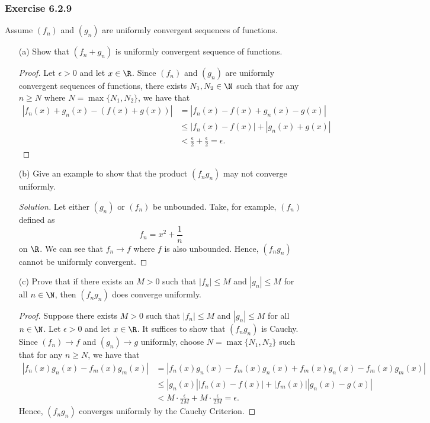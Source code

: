 \subsubsection{Exercise 6.2.9} Assume \( (f_n)  \) and \( (g_n)  \) are uniformly convergent sequences of functions.
\begin{enumerate}
    \item[(a)] Show that \( (f_n + g_n)  \) is uniformly convergent sequence of functions.
        \begin{proof}
        Let \( \epsilon > 0  \) and let \( x \in \R  \). Since \( (f_n)  \) and \( (g_n)  \) are uniformly convergent sequences of functions, there exists \( N_1, N_2 \in \N  \) such that for any \( n \geq N  \) where \( N = \max \{ N_1, N_2  \}  \), we have that 
        \begin{align*}
            | f_n(x) + g_n(x) - (f(x) + g(x))  | &= | f_n(x) - f(x) + g_n(x) - g(x)   |  \\
                                                 &\leq | f_n(x) - f(x)  | + | g_n(x) + g(x)  | \\
                                                 &< \frac{ \epsilon  }{ 2 } + \frac{ \epsilon  }{ 2 } = \epsilon.
        \end{align*}
        \end{proof}
    \item[(b)] Give an example to show that the product \( (f_ng_n)  \) may not converge uniformly.
        \begin{proof}[Solution]
        Let either \( (g_n)  \) or \( (f_n)  \) be unbounded. Take, for example, \( (f_n)  \) defined as 
        \[  f_n = x^2 + \frac{ 1 }{ n }  \]
        on \( \R  \).
        We can see that \( f_n \to f  \) where \( f  \) is also unbounded. Hence, \( (f_ng_n) \) cannot be uniformly convergent. 
        \end{proof}
    \item[(c)] Prove that if there exists an \( M > 0  \) such that \( | f_n  | \leq M  \) and \( | g_n  | \leq M  \) for all \( n \in \N \), then \( (f_ng_n) \) does converge uniformly.
        \begin{proof}
        Suppose there exists \( M > 0  \) such that \( | f_n | \leq M  \) and \( | g_n | \leq M  \) for all \( n \in \N  \). Let \( \epsilon > 0  \) and let \( x \in \R  \). It suffices to show that \( (f_ng_n) \) is Cauchy. Since \( (f_n) \to f  \) and \( (g_n) \to g  \) uniformly, choose \( N = \max \{ N_1, N_2  \}   \) such that for any \( n \geq N  \), we have that 
        \begin{align*}
           | f_n(x) g_n(x) - f_m(x) g_m(x)  |  &= | f_n(x) g_n(x) -f_m(x)g_n(x) + f_m(x)g_n(x) - f_m(x)g_m(x) |  \\
                                           &\leq | g_n(x)  | | f_n(x) - f(x)  | + | f_m(x)  | | g_n(x) - g(x)  | \\
                                           &< M \cdot \frac{ \epsilon  }{ 2 M  }  + M \cdot \frac{ \epsilon  }{ 2M  } = \epsilon. 
        \end{align*}
        Hence, \( (f_ng_n)  \) converges uniformly by the Cauchy Criterion.
        \end{proof}
\end{enumerate}

